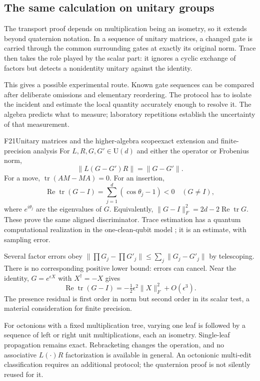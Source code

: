 \documentclass[11pt,a4paper]{article}
\newcommand{\U}{\mathrm{U}}
\DeclareMathOperator{\Real}{Re}
\DeclareMathOperator{\tr}{tr}
\begin{document}
\subsection{The same calculation on unitary groups}
The transport proof depends on multiplication being an isometry, so it extends
beyond quaternion notation. In a sequence of unitary matrices, a changed gate
is carried through the common surrounding gates at exactly its original norm.
Trace then takes the role played by the scalar part: it ignores a cyclic
exchange of factors but detects a nonidentity unitary against the identity.

This gives a possible experimental route. Known gate sequences can be
compared after deliberate omissions and elementary reordering. The protocol
has to isolate the incident and estimate the local quantity accurately enough
to resolve it. The algebra predicts what to measure; laboratory repetitions
establish the uncertainty of that measurement.

\begin{formal}{F21}{Unitary matrices and the higher-algebra scope}{exact extension and finite-precision analysis}
For $L,R,G,G'\in\U(d)$ and either the operator or Frobenius norm,
\begin{equation}
 \|L(G-G')R\|=\|G-G'\|.
\end{equation}
For a move, $\tr(AM-MA)=0$. For an insertion,
\begin{equation}\label{eq:unitary-trace}
 \Real\tr(G-I)=\sum_{j=1}^d(\cos\theta_j-1)<0
 \quad(G\ne I),
\end{equation}
where $e^{i\theta_j}$ are the eigenvalues of $G$. Equivalently,
$\|G-I\|_F^2=2d-2\Real\tr G$.
These prove the same aligned discriminator. Trace estimation has a quantum
computational realization in the one-clean-qubit model \citep{KnillLaflamme1998};
it is an estimate, with sampling error.

Several factor errors obey
$\|\prod G_j-\prod G'_j\|\leq\sum_j\|G_j-G'_j\|$ by telescoping.
There is no corresponding positive lower bound: errors can cancel. Near the
identity, $G=e^{\epsilon X}$ with $X^\dagger=-X$ gives
\begin{equation}
 \Real\tr(G-I)=-\tfrac12\epsilon^2\|X\|_F^2+O(\epsilon^3).
\end{equation}
The presence residual is first order in norm but second order in its scalar
test, a material consideration for finite precision.

For octonions with a fixed multiplication tree, varying one leaf is followed
by a sequence of left or right unit multiplications, each an isometry.
Single-leaf propagation remains exact. Rebracketing changes the operation,
and no associative $L(\cdot)R$ factorization is available in general. An
octonionic multi-edit classification requires an additional protocol; the
quaternion proof is not silently reused for it.
\end{formal}
\end{document}

